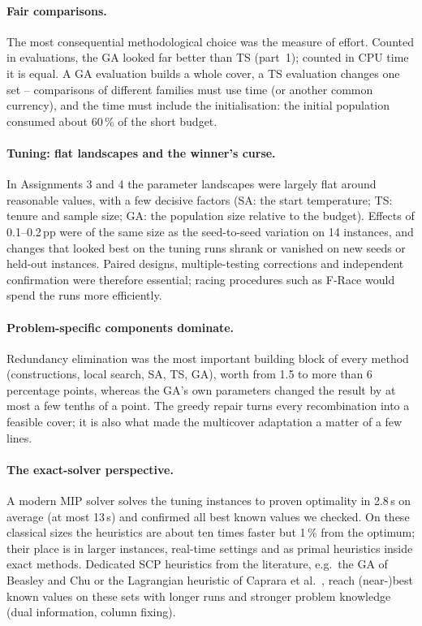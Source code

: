 \documentclass[11pt,a4paper]{article}
\begin{document}
\paragraph{Fair comparisons.} The most consequential methodological choice was the measure of effort. Counted in evaluations, the GA looked far better than TS (part~1); counted in CPU time it is equal. A GA evaluation builds a whole cover, a TS evaluation changes one set -- comparisons of different families must use time (or another common currency), and the time must include the initialisation: the initial population consumed about 60\,\% of the short budget.

\paragraph{Tuning: flat landscapes and the winner's curse.} In Assignments 3 and 4 the parameter landscapes were largely flat around reasonable values, with a few decisive factors (SA: the start temperature; TS: tenure and sample size; GA: the population size relative to the budget).
Effects of 0.1--0.2\,pp were of the same size as the seed-to-seed variation on 14 instances, and changes that looked best on the tuning runs shrank or vanished on new seeds or held-out instances. Paired designs, multiple-testing corrections and independent confirmation were therefore essential; racing procedures such as F-Race \cite{birattari2010} would spend the runs more efficiently.

\paragraph{Problem-specific components dominate.} Redundancy elimination was the most important building block of every method (constructions, local search, SA, TS, GA), worth from 1.5 to more than 6 percentage points, whereas the GA's own parameters changed the result by at most a few tenths of a point. The greedy repair turns every recombination into a feasible cover; it is also what made the multicover adaptation a matter of a few lines.

\paragraph{The exact-solver perspective.} A modern MIP solver solves the tuning instances to proven optimality in 2.8\,s on average (at most 13\,s) and confirmed all best known values we checked. On these classical sizes the heuristics are about ten times faster but 1\,\% from the optimum; their place is in larger instances, real-time settings and as primal heuristics inside exact methods. Dedicated SCP heuristics from the literature, e.g.\ the GA of Beasley and Chu \cite{beasley1996} or the Lagrangian heuristic of Caprara et al.\ \cite{caprara1999}, reach (near-)best known values on these sets with longer runs and stronger problem knowledge (dual information, column fixing).
\end{document}
